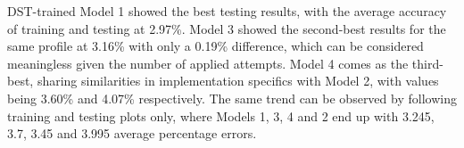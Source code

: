 DST-trained Model 1 showed the best testing results, with the average accuracy of training and testing at 2.97\%.
Model 3 showed the second-best results for the same profile at 3.16\% with only a 0.19\% difference, which can be considered meaningless given the number of applied attempts.
Model 4 comes as the third-best, sharing similarities in implementation specifics with Model 2, with values being 3.60\% and 4.07\% respectively.
The same trend can be observed by following training and testing plots only, where Models 1, 3, 4 and 2 end up with 3.245, 3.7, 3.45 and 3.995 average percentage errors.





%
%

%
%
